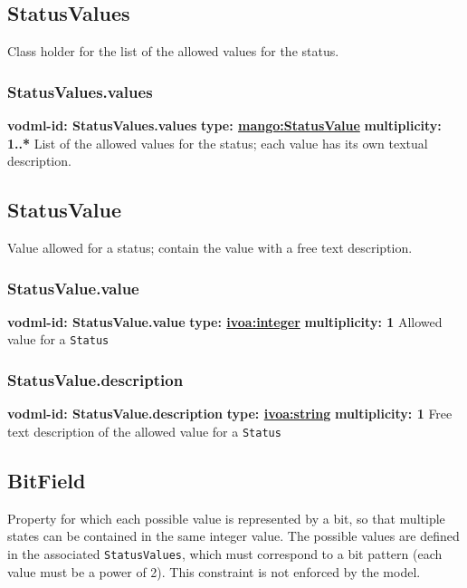   \subsection{StatusValues}
    \label{sect:StatusValues}
    Class holder for the list of the allowed values for the status.

    \subsubsection{StatusValues.values}
    \textbf{vodml-id: StatusValues.values} \newline
    \textbf{type: \hyperref[sect:StatusValue]{mango:StatusValue}} \newline
    \textbf{multiplicity: 1..*} \newline
    List of the allowed values for the status; each value has its own textual description.

  \subsection{StatusValue}
    \label{sect:StatusValue}
    Value allowed for a status; contain the value with a free text description.

    \subsubsection{StatusValue.value}
    \textbf{vodml-id: StatusValue.value} \newline
    \textbf{type: \hyperref[sect:ivoa]{ivoa:integer}} \newline
    \textbf{multiplicity: 1} \newline
    Allowed value for a \texttt{Status}

    \subsubsection{StatusValue.description}
    \textbf{vodml-id: StatusValue.description} \newline
    \textbf{type: \hyperref[sect:ivoa]{ivoa:string}} \newline
    \textbf{multiplicity: 1} \newline
    Free text description of the allowed value for a \texttt{Status}

  \subsection{BitField}
    \label{sect:BitField}
    Property for which each possible value is represented by a bit, so that multiple states can be contained in the same integer value. The possible values are defined in the associated \texttt{StatusValues}, which must correspond to a bit pattern (each value must be a power of 2). This constraint is not enforced by the model.

